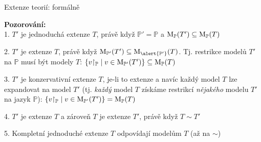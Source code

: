 \documentclass{beamer}
\begin{document}
\begin{frame}{Extenze teorií: formálně}


    {\small
    \textbf{Pozorování:}\\
    1. $T'$ je jednoduchá extenze $T$, právě když $\mathbb P'=\mathbb P$ a $\operatorname{M}_\mathbb P(T')\subseteq\operatorname{M}_\mathbb P(T)$

    2. $T'$ je extenze $T$, právě když $\M_{\mathbb P'}(T')\subseteq\M_{\alert{\mathbb P'}}(T)$. Tj. \alert{restrikce}
    modelů $T'$ na $\mathbb P$ musí být modely $T$:
    \alert{$
    \{v{\restriction_\mathbb P}\mid v\in\operatorname{M}_{\mathbb P'}(T')\}\subseteq\operatorname{M}_\mathbb P(T)
    $}

    3. $T'$ je konzervativní extenze $T$, je-li to extenze a navíc každý model $T$ lze \alert{expandovat} na model $T'$ (tj. \emph{každý} model $T$ získáme restrikcí \emph{nějakého} modelu $T'$ na jazyk $\mathbb P$):
    \alert{$
    \{v{\restriction_\mathbb P}\mid v\in\operatorname{M}_      {\mathbb P'}(T')\}=\operatorname{M}_\mathbb P(T)
    $}

    4. $T'$ je extenze $T$ a zároveň $T$ je extenze $T'$, právě když $T\sim T'$     

    5. \alert{Kompletní jednoduché extenze} $T$ \alert{odpovídají modelům} $T$ (až na $\sim$)
    }

\end{frame}
\end{document}
